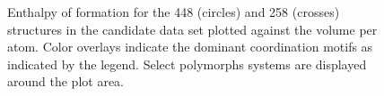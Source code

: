 \begin{figure}[!htb]
\centering
{}
\caption{\label{fig:E_vs_V}
Enthalpy of formation for the 448 \IrOtwo (circles) and 258 \IrOthree (crosses) structures in the candidate data set plotted against the volume per atom.
%
Color overlays indicate the dominant coordination motifs as indicated by the legend.
%
Select polymorphs systems are displayed around the plot area.
}
\end{figure}









